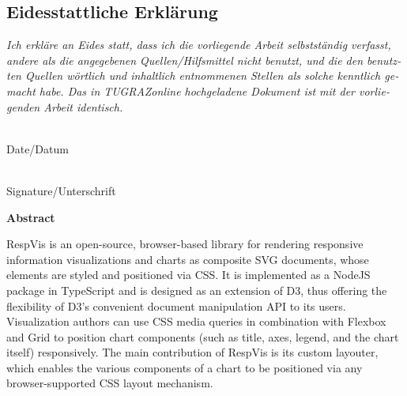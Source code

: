 \vspace{1cm}


\begin{otherlanguage}{austrian}

    \subsection*{Eidesstattliche Erklärung}
    \noindent
    \textit{
        Ich erkläre an Eides statt, dass ich die vorliegende Arbeit
        selbstständig verfasst, andere als die angegebenen Quellen/Hilfsmittel
        nicht benutzt, und die den benutzten Quellen wörtlich und inhaltlich
        entnommenen Stellen als solche kenntlich gemacht habe. Das in
        TUGRAZonline hochgeladene Dokument ist mit der vorliegenden
        Arbeit identisch.}

    \vspace{2cm}

    \noindent
    \parbox[top]{4cm}{
        \begin{center}
            \underline{\hspace*{4cm}} \\
            Date/Datum
        \end{center}
    }
    \hfill
    \parbox[top]{6cm}{
        \begin{center}
            \underline{\hspace*{6cm}} \\
            Signature/Unterschrift
        \end{center}
    }

\end{otherlanguage}






\cleardoublepage

\vspace*{2cm}

\begin{center}
    {\Large\sffamily\bfseries Abstract}
\end{center}

RespVis is an open-source, browser-based library for rendering
responsive information visualizations and charts as composite SVG
documents, whose elements are styled and positioned via CSS. It is
implemented as a NodeJS package in TypeScript and is designed as an
extension of D3, thus offering the flexibility of D3's convenient
document manipulation API to its users. Visualization authors can use
CSS media queries in combination with Flexbox and Grid to position
chart components (such as title, axes, legend, and the chart itself)
responsively. The main contribution of RespVis is its custom layouter,
which enables the various components of a chart to be positioned via
any browser-supported CSS layout mechanism.

